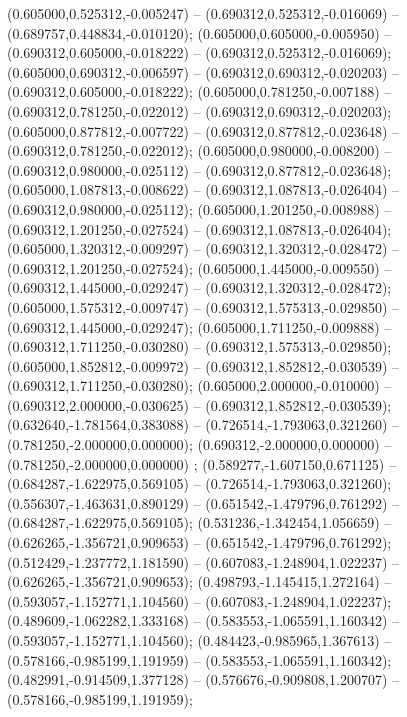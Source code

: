  (0.605000,0.525312,-0.005247) -- (0.690312,0.525312,-0.016069) -- (0.689757,0.448834,-0.010120);
 (0.605000,0.605000,-0.005950) -- (0.690312,0.605000,-0.018222) -- (0.690312,0.525312,-0.016069);
 (0.605000,0.690312,-0.006597) -- (0.690312,0.690312,-0.020203) -- (0.690312,0.605000,-0.018222);
 (0.605000,0.781250,-0.007188) -- (0.690312,0.781250,-0.022012) -- (0.690312,0.690312,-0.020203);
 (0.605000,0.877812,-0.007722) -- (0.690312,0.877812,-0.023648) -- (0.690312,0.781250,-0.022012);
 (0.605000,0.980000,-0.008200) -- (0.690312,0.980000,-0.025112) -- (0.690312,0.877812,-0.023648);
 (0.605000,1.087813,-0.008622) -- (0.690312,1.087813,-0.026404) -- (0.690312,0.980000,-0.025112);
 (0.605000,1.201250,-0.008988) -- (0.690312,1.201250,-0.027524) -- (0.690312,1.087813,-0.026404);
 (0.605000,1.320312,-0.009297) -- (0.690312,1.320312,-0.028472) -- (0.690312,1.201250,-0.027524);
 (0.605000,1.445000,-0.009550) -- (0.690312,1.445000,-0.029247) -- (0.690312,1.320312,-0.028472);
 (0.605000,1.575312,-0.009747) -- (0.690312,1.575313,-0.029850) -- (0.690312,1.445000,-0.029247);
 (0.605000,1.711250,-0.009888) -- (0.690312,1.711250,-0.030280) -- (0.690312,1.575313,-0.029850);
 (0.605000,1.852812,-0.009972) -- (0.690312,1.852812,-0.030539) -- (0.690312,1.711250,-0.030280);
 (0.605000,2.000000,-0.010000) -- (0.690312,2.000000,-0.030625) -- (0.690312,1.852812,-0.030539);
 (0.632640,-1.781564,0.383088) -- (0.726514,-1.793063,0.321260) -- (0.781250,-2.000000,0.000000);
 (0.690312,-2.000000,0.000000) -- (0.781250,-2.000000,0.000000) ;
 (0.589277,-1.607150,0.671125) -- (0.684287,-1.622975,0.569105) -- (0.726514,-1.793063,0.321260);
 (0.556307,-1.463631,0.890129) -- (0.651542,-1.479796,0.761292) -- (0.684287,-1.622975,0.569105);
 (0.531236,-1.342454,1.056659) -- (0.626265,-1.356721,0.909653) -- (0.651542,-1.479796,0.761292);
 (0.512429,-1.237772,1.181590) -- (0.607083,-1.248904,1.022237) -- (0.626265,-1.356721,0.909653);
 (0.498793,-1.145415,1.272164) -- (0.593057,-1.152771,1.104560) -- (0.607083,-1.248904,1.022237);
 (0.489609,-1.062282,1.333168) -- (0.583553,-1.065591,1.160342) -- (0.593057,-1.152771,1.104560);
 (0.484423,-0.985965,1.367613) -- (0.578166,-0.985199,1.191959) -- (0.583553,-1.065591,1.160342);
 (0.482991,-0.914509,1.377128) -- (0.576676,-0.909808,1.200707) -- (0.578166,-0.985199,1.191959);
